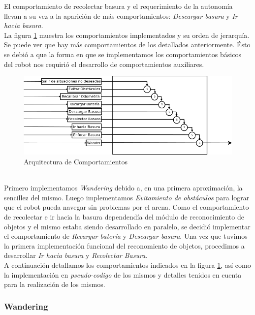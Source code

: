 El comportamiento de recolectar basura y el requerimiento de la autonom\'ia llevan a su vez
a la aparici\'on de m\'as comportamientos: \emph{Descargar basura} y \emph{Ir hacia basura}.
\\
La figura \ref{fig:architecture} muestra los comportamientos implementados y su orden de jerarqu\'ia.
Se puede ver que hay m\'as comportamientos de los detallados anteriormente. \'Esto se debi\'o a que la forma
en que se implementamos los comportamientos b\'asicos del robot nos requiri\'o el desarrollo
de comportamientos auxiliares.
\\
\begin{figure}[htp]
\begin{center}
\includegraphics[scale=0.5]{comportamientos/behavioursArchitecture.png}
\caption{Arquitectura de Comportamientos}
\label{fig:architecture}
\end{center}
\end{figure}
\\
Primero implementamos \emph{Wandering} debido a, en una primera aproximaci\'on, la sencillez
del mismo. Luego implementamos \emph{Evitamiento de obst\'aculos} para lograr que el robot pueda
navegar sin problemas por el arena. Como el comportamiento de recolectar e ir hacia la basura
dependend\'ia del m\'odulo de reconocimiento de objetos y el mismo estaba siendo desarrollado
en paralelo, se decidi\'o implementar el comportamiento de \emph{Recargar bater\'ia} y \emph{Descargar basura}.
Una vez que tuvimos la primera implementaci\'on funcional del reconomiento de objetos, procedimos a
desarrollar \emph{Ir hacia basura} y \emph{Recolectar Basura}.
\\
A continuaci\'on detallamos los comportamientos indicados en la figura \ref{fig:architecture},
as\'i como la implementaci\'on en \textit{pseudo-codigo} de los mismos y detalles tenidos
en cuenta para la realizaci\'on de los mismos.

\subsubsection{Wandering}
\label{wandering}

